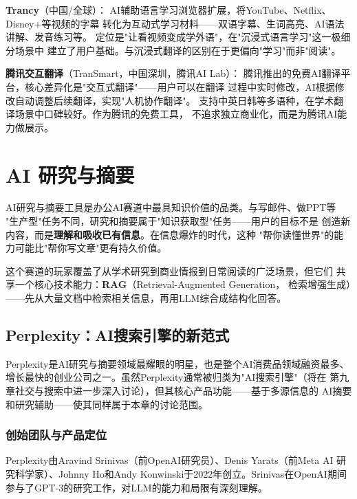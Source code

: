 \textbf{Trancy}（中国/全球）：
AI辅助语言学习浏览器扩展，将YouTube、Netflix、Disney+等视频的字幕
转化为互动式学习材料——双语字幕、生词高亮、AI语法讲解、发音练习等。
定位是"让看视频变成学外语"，在"沉浸式语言学习"这一极细分场景中
建立了用户基础。与沉浸式翻译的区别在于更偏向"学习"而非"阅读"。

\textbf{腾讯交互翻译}（TranSmart，中国深圳，腾讯AI Lab）：
腾讯推出的免费AI翻译平台，核心差异化是"交互式翻译"——用户可以在翻译
过程中实时修改，AI根据修改自动调整后续翻译，实现"人机协作翻译"。
支持中英日韩等多语种，在学术翻译场景中口碑较好。作为腾讯的免费工具，
不追求独立商业化，而是为腾讯AI能力做展示。



\section{AI 研究与摘要}
\label{sec:cprod-research}

AI研究与摘要工具是办公AI赛道中最具知识价值的品类。与写邮件、做PPT等
"生产型"任务不同，研究和摘要属于"知识获取型"任务——用户的目标不是
创造新内容，而是\textbf{理解和吸收已有信息}。在信息爆炸的时代，这种
"帮你读懂世界"的能力可能比"帮你写文章"更有持久价值。

这个赛道的玩家覆盖了从学术研究到商业情报到日常阅读的广泛场景，但它们
共享一个核心技术能力：\textbf{RAG}（Retrieval-Augmented Generation，
检索增强生成）——先从大量文档中检索相关信息，再用LLM综合成结构化回答。

\subsection{Perplexity：AI搜索引擎的新范式}
\label{subsec:ch06-perplexity}

Perplexity是AI研究与摘要领域最耀眼的明星，也是整个AI消费品领域融资最多、
增长最快的创业公司之一。虽然Perplexity通常被归类为"AI搜索引擎"（将在
第九章社交与搜索中进一步深入讨论），但其核心产品功能——基于多源信息的
AI摘要和研究辅助——使其同样属于本章的讨论范围。

\subsubsection{创始团队与产品定位}
Perplexity由Aravind Srinivas（前OpenAI研究员）、Denis Yarats（前Meta AI
研究科学家）、Johnny Ho和Andy Konwinski于2022年创立。Srinivas在OpenAI期间
参与了GPT-3的研究工作，对LLM的能力和局限有深刻理解。

